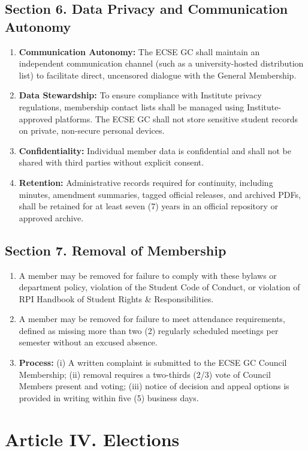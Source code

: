 \documentclass[11pt]{article}
\newcommand{\orgshort}{ECSE GC}
\newcommand{\Article}[2]{\section*{Article #1. #2}}
\newcommand{\Sec}[1]{\subsection*{Section {#1}}}
\begin{document}
\Sec{6. Data Privacy and Communication Autonomy}
\begin{enumerate}[label=\alph*)]
    \item \textbf{Communication Autonomy:} The \orgshort{} shall maintain an independent communication channel (such as a university-hosted distribution list) to facilitate direct, uncensored dialogue with the General Membership.
    \item \textbf{Data Stewardship:} To ensure compliance with Institute privacy regulations, membership contact lists shall be managed using Institute-approved platforms. The \orgshort{} shall not store sensitive student records on private, non-secure personal devices.
    \item \textbf{Confidentiality:} Individual member data is confidential and shall not be shared with third parties without explicit consent.
    \item \textbf{Retention:} Administrative records required for continuity, including minutes, amendment summaries, tagged official releases, and archived PDFs, shall be retained for at least seven (7) years in an official repository or approved archive.
\end{enumerate}

\Sec{7. Removal of Membership}
\begin{enumerate}[label=\alph*)]
    \item A member may be removed for failure to comply with these bylaws or department policy, violation of the Student Code of Conduct, or violation of RPI Handbook of Student Rights \& Responsibilities.
    \item A member may be removed for failure to meet attendance requirements, defined as missing more than two (2) regularly scheduled meetings per semester without an excused absence.
    \item \textbf{Process:} (i) A written complaint is submitted to the \orgshort{} Council Membership; (ii) removal requires a two-thirds (2/3) vote of Council Members present and voting; (iii) notice of decision and appeal options is provided in writing within five (5) business days.
\end{enumerate}

\Article{IV}{Elections}
\end{document}
